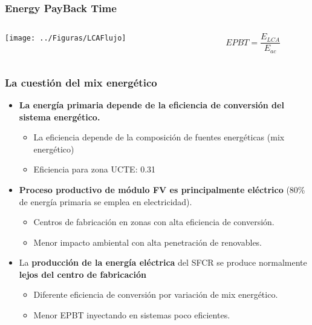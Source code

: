 \documentclass[serif, xcolor=dvipsnames]{beamer}
\begin{document}
\begin{frame}
  \frametitle{Energy PayBack Time}
  \begin{columns}
    \begin{column}{7cm}
      \texttt{[image: ../Figuras/LCAFlujo]}
    \end{column}
    \begin{column}{3cm}
      \begin{equation*}
        EPBT=\frac{E_{LCA}}{E_{ac}}
      \end{equation*}
    \end{column}
  \end{columns}
\end{frame}

\begin{frame}
  \frametitle{La cuestión del mix energético}
  \begin{itemize}
  \item \textbf{La energía primaria depende de la eficiencia de conversión del
    sistema energético.}
    \begin{itemize}
    \item La eficiencia depende de la composición de fuentes
      energéticas (mix energético)
    \item Eficiencia para zona UCTE: 0.31
    \end{itemize}
  \item \textbf{Proceso productivo de módulo FV es principalmente eléctrico}
    (80\% de energía primaria se emplea en electricidad).
    \begin{itemize}
    \item Centros de fabricación en zonas con alta eficiencia de
      conversión.
    \item Menor impacto ambiental con alta penetración de renovables.
    \end{itemize}
  \item La \textbf{producción de la energía eléctrica} del SFCR se produce normalmente \textbf{lejos del
    centro de fabricación} 
    \begin{itemize}
    \item Diferente eficiencia de conversión por variación de mix
      energético.
    \item Menor EPBT inyectando en sistemas poco eficientes.
    \end{itemize}
  \end{itemize}

\end{frame}
\end{document}
